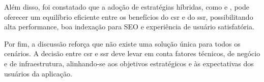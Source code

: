 Além disso, foi constatado que a adoção de estratégias híbridas, como  e , pode oferecer um equilíbrio eficiente entre os benefícios do \acrshort{csr} e do \acrshort{ssr}, possibilitando alta performance, boa indexação para SEO e experiência de usuário satisfatória.

Por fim, a discussão reforça que não existe uma solução única para todos os cenários. A decisão entre \acrshort{csr} e \acrshort{ssr} deve levar em conta fatores técnicos, de negócio e de infraestrutura, alinhando-se aos objetivos estratégicos e às expectativas dos usuários da aplicação.


